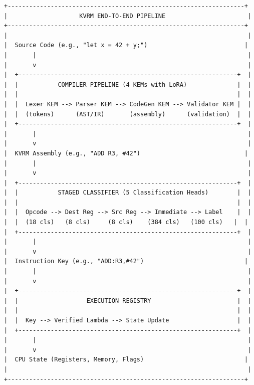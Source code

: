 \documentclass[11pt]{article}
\begin{document}
\begin{verbatim}
+------------------------------------------------------------------+
|                    KVRM END-TO-END PIPELINE                       |
+------------------------------------------------------------------+
|                                                                   |
|  Source Code (e.g., "let x = 42 + y;")                           |
|       |                                                           |
|       v                                                           |
|  +-------------------------------------------------------------+  |
|  |           COMPILER PIPELINE (4 KEMs with LoRA)              |  |
|  |                                                             |  |
|  |  Lexer KEM --> Parser KEM --> CodeGen KEM --> Validator KEM |  |
|  |  (tokens)      (AST/IR)       (assembly)      (validation)  |  |
|  +-------------------------------------------------------------+  |
|       |                                                           |
|       v                                                           |
|  KVRM Assembly (e.g., "ADD R3, #42")                             |
|       |                                                           |
|       v                                                           |
|  +-------------------------------------------------------------+  |
|  |           STAGED CLASSIFIER (5 Classification Heads)        |  |
|  |                                                             |  |
|  |  Opcode --> Dest Reg --> Src Reg --> Immediate --> Label    |  |
|  |  (18 cls)   (8 cls)     (8 cls)    (384 cls)   (100 cls)   |  |
|  +-------------------------------------------------------------+  |
|       |                                                           |
|       v                                                           |
|  Instruction Key (e.g., "ADD:R3,#42")                            |
|       |                                                           |
|       v                                                           |
|  +-------------------------------------------------------------+  |
|  |                   EXECUTION REGISTRY                        |  |
|  |                                                             |  |
|  |  Key --> Verified Lambda --> State Update                   |  |
|  +-------------------------------------------------------------+  |
|       |                                                           |
|       v                                                           |
|  CPU State (Registers, Memory, Flags)                            |
|                                                                   |
+------------------------------------------------------------------+
\end{verbatim}
\end{document}

